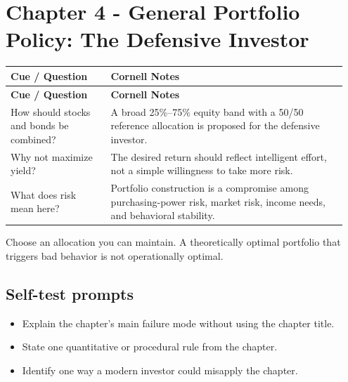 \documentclass[11pt]{article}
\begin{document}
\section{Chapter 4 - General Portfolio Policy: The Defensive Investor}
\begin{longtable}{@{}>{\raggedright\arraybackslash}p{0.29\linewidth}>{\raggedright\arraybackslash}p{0.66\linewidth}@{}}\toprule\textbf{Cue / Question} & \textbf{Cornell Notes}\\\midrule\endfirsthead\toprule\textbf{Cue / Question} & \textbf{Cornell Notes}\\\midrule\endhead
How should stocks and bonds be combined? & A broad 25\%--75\% equity band with a 50/50 reference allocation is proposed for the defensive investor. \\
Why not maximize yield? & The desired return should reflect intelligent effort, not a simple willingness to take more risk. \\
What does risk mean here? & Portfolio construction is a compromise among purchasing-power risk, market risk, income needs, and behavioral stability. \\
\bottomrule\end{longtable}
\begin{principlebox}Choose an allocation you can maintain. A theoretically optimal portfolio that triggers bad behavior is not operationally optimal.\end{principlebox}
\subsection*{Self-test prompts}\begin{itemize}\item Explain the chapter's main failure mode without using the chapter title.\item State one quantitative or procedural rule from the chapter.\item Identify one way a modern investor could misapply the chapter.\end{itemize}
\end{document}
